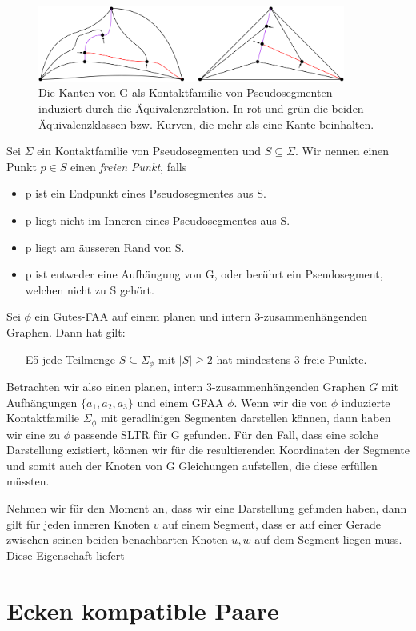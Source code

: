 \begin{figure}[h]
	\centering
  \includegraphics[width=0.9\textwidth]{pseudo_seg.png}
  \caption{Die Kanten von G als Kontaktfamilie von Pseudosegmenten induziert durch die Äquivalenzrelation. In rot und grün die beiden Äquivalenzklassen bzw. Kurven, die mehr als eine Kante beinhalten.}
\end{figure}

\begin{definition}
Sei $\Sigma$ ein Kontaktfamilie von Pseudosegmenten und $S\subseteq\Sigma$. Wir nennen einen Punkt $p\in S$ einen \textit{freien Punkt}, falls
\begin{itemize}
\item p ist ein Endpunkt eines Pseudosegmentes aus S.
\item p liegt nicht im Inneren eines Pseudosegmentes aus S.
\item p liegt am äusseren Rand von S.
\item p ist entweder eine Aufhängung von G, oder berührt ein Pseudosegment, welchen nicht zu S gehört.
\end{itemize} 
\end{definition}

\begin{lemma}\cite[Lemma 2.8]{af13}
Sei $\phi$ ein Gutes-FAA auf einem planen und intern 3-zusammenhängenden Graphen. Dann hat gilt: 
\begin{itemize}
\item [E5] jede Teilmenge $S \subseteq \Sigma_{\phi}$ mit $|S| \geq 2$ hat mindestens 3 freie Punkte.
\end{itemize}
\end{lemma}

Betrachten wir also einen planen, intern 3-zusammenhängenden Graphen $G$ mit Aufhängungen $\{a_1,a_2,a_3\}$ und einem GFAA $\phi$. Wenn wir die von $\phi$ induzierte Kontaktfamilie $\Sigma_{\phi}$ mit geradlinigen Segmenten darstellen können, dann haben wir eine zu $\phi$ passende SLTR für G gefunden. Für den Fall, dass eine solche Darstellung existiert, können wir für die resultierenden Koordinaten der Segmente und somit auch der Knoten von G Gleichungen aufstellen, die diese erfüllen müssten.

\begin{definition}

\end{definition}

Nehmen wir für den Moment an, dass wir eine Darstellung gefunden haben, dann gilt für jeden inneren Knoten $v$ auf einem Segment, dass er auf einer Gerade zwischen seinen beiden benachbarten Knoten $u,w$ auf dem Segment liegen muss. Diese Eigenschaft liefert 

\section{Ecken kompatible Paare}
